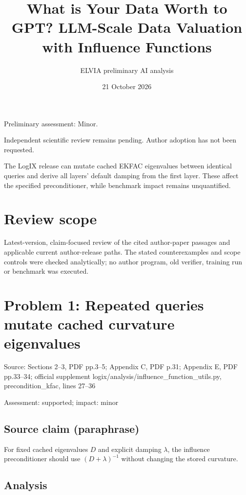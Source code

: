 \documentclass[11pt]{article}
\begin{document}
\title{What is Your Data Worth to GPT? LLM-Scale Data Valuation with Influence Functions}

\author{ELVIA preliminary AI analysis}\date{21 October 2026}\maketitle

Preliminary assessment: Minor.\par

Independent scientific review remains pending. Author adoption has not been requested.

The LogIX release can mutate cached EKFAC eigenvalues between identical queries and derive all layers’ default damping from the first layer. These affect the specified preconditioner, while benchmark impact remains unquantified.

\section*{Review scope}

Latest-version, claim-focused review of the cited author-paper passages and applicable current author-release paths. The stated counterexamples and scope controls were checked analytically; no author program, old verifier, training run or benchmark was executed.

\section*{Problem 1: Repeated queries mutate cached curvature eigenvalues}

Source: Sections 2–3, PDF pp.3–5; Appendix C, PDF p.31; Appendix E, PDF pp.33–34; official supplement logix/analysis/influence\_function\_utils.py, precondition\_kfac, lines 27–36

Assessment: supported; impact: minor

\subsection*{Source claim (paraphrase)}

For fixed cached eigenvalues \(D\) and explicit damping \(\lambda\), the influence preconditioner should use \((D+\lambda)^{-1}\) without changing the stored curvature.

\subsection*{Analysis}
\end{document}

